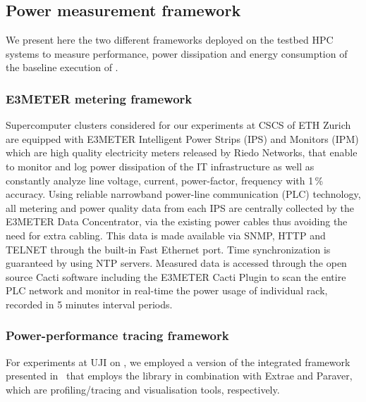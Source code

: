 \subsection{Power measurement framework}
\label{subsec:3.3}

We present here  the two different frameworks deployed  on the testbed
HPC  systems  to measure  performance,  power  dissipation and  energy
consumption of the baseline execution of \cosmoart.

\subsubsection{E3METER metering framework}

Supercomputer clusters  considered for our experiments at  CSCS of ETH
Zurich are  equipped with E3METER  Intelligent Power Strips  (IPS) and
Monitors (IPM)  which are high quality electricity  meters released by
Riedo Networks,  that enable to  monitor and log power  dissipation of
the  IT infrastructure  as well  as constantly  analyze  line voltage,
current, power-factor, frequency  with 1\,\% accuracy.  Using reliable
narrowband power-line communication (PLC) technology, all metering and
power  quality data  from  each  IPS are  centrally  collected by  the
E3METER Data Concentrator, via the existing power cables thus avoiding
the need  for extra  cabling.  This data  is made available  via SNMP,
HTTP  and  TELNET  through  the  built-in Fast  Ethernet  port.   Time
synchronization is guaranteed by  using NTP servers.  Measured data is
accessed through the open  source Cacti software including the E3METER
Cacti Plugin to  scan the entire PLC network  and monitor in real-time
the power  usage of  individual rack, recorded  in 5  minutes interval
periods.

\subsubsection{Power-performance tracing framework}

For  experiments  at UJI  on  \tinto, we  employed  a  version of  the
integrated  framework presented  in~\cite{energy13}  that employs  the
\pmlib  library in  combination  with Extrae  and  Paraver, which  are
profiling/tracing and visualisation tools, respectively.

